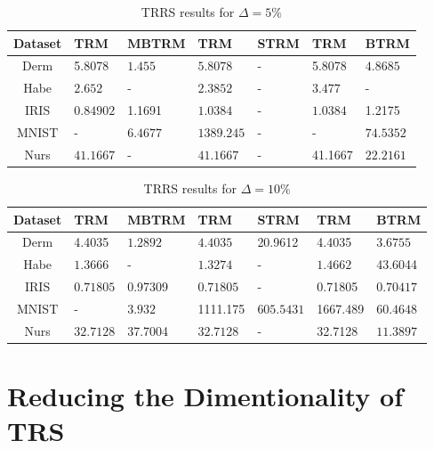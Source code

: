 \documentclass[letterpaper,12pt,titlepage,oneside,final]{book}
\begin{document}
	\begin{table}[h] 
		\centering 
		\begin{tabular}{ |c||l|l||l|l||l|l| } 
			\hline 
			\textbf{Dataset} & \textbf{TRM} & \textbf{MBTRM} & \textbf{TRM} & \textbf{STRM} & \textbf{TRM} & \textbf{BTRM} \\ 
			\hline 
			\hline 
			Derm &5.8078 & $\mathbf{1.455}$ & $\mathbf{5.8078}$ & - &5.8078 & $\mathbf{4.8685}$\\ 
			\hline 
			Habe & $\mathbf{2.652}$ & - & $\mathbf{2.3852}$ & - & $\mathbf{3.477}$ & -\\ 
			\hline 
			IRIS & $\mathbf{0.84902}$ &1.1691 & $\mathbf{1.0384}$ & - & $\mathbf{1.0384}$ &1.2175\\ 
			\hline 
			MNIST & - & $\mathbf{6.4677}$ & $\mathbf{1389.245}$ & - & - & $\mathbf{74.5352}$\\ 
			\hline 
			Nurs & $\mathbf{41.1667}$ & - & $\mathbf{41.1667}$ & - &41.1667 & $\mathbf{22.2161}$\\ 
			\hline 
		\end{tabular} 
		\caption{TRRS results for $\Delta = 5\%$} \label{SMBTRMTRM5} \end{table}
	
	\begin{table}[h] 
		\centering 
		\begin{tabular}{ |c||l|l||l|l||l|l| } 
			\hline 
			\textbf{Dataset} & \textbf{TRM} & \textbf{MBTRM} & \textbf{TRM} & \textbf{STRM} & \textbf{TRM} & \textbf{BTRM} \\ 
			\hline 
			\hline 
			Derm &4.4035 & $\mathbf{1.2892}$ & $\mathbf{4.4035}$ &20.9612 &4.4035 & $\mathbf{3.6755}$\\ 
			\hline 
			Habe & $\mathbf{1.3666}$ & - & $\mathbf{1.3274}$ & - & $\mathbf{1.4662}$ &43.6044\\ 
			\hline 
			IRIS & $\mathbf{0.71805}$ &0.97309 & $\mathbf{0.71805}$ & - &0.71805 & $\mathbf{0.70417}$\\ 
			\hline 
			MNIST & - & $\mathbf{3.932}$ &1111.175 & $\mathbf{605.5431}$ &1667.489 & $\mathbf{60.4648}$\\ 
			\hline 
			Nurs & $\mathbf{32.7128}$ &37.7004 & $\mathbf{32.7128}$ & - &32.7128 & $\mathbf{11.3897}$\\ 
			\hline 
		\end{tabular} 
		\caption{TRRS results for $\Delta = 10\%$} \label{SMBTRMTRM10} \end{table}
	
	\section{Reducing the Dimentionality of TRS}
	
\end{document}

